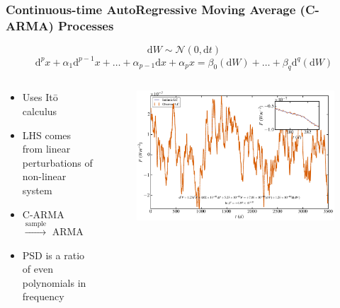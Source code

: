 \documentclass[hyperref={pdfpagelabels=false}]{beamer}
\begin{document}
\begin{frame}
\frametitle{Continuous-time AutoRegressive Moving Average (C-ARMA) Processes}
  \begin{equation*} \mathrm{d}W \sim \mathcal{N}(0,\mathrm{d}t) \end{equation*}
  \begin{equation*}\label{eq:CARMA} \mathrm{d}^{p}x + \alpha_{1} \mathrm{d}^{p-1}x + \ldots + \alpha_{p-1} \mathrm{d}x + \alpha_{p}x = \beta_{0} (\mathrm{d}W) + \ldots + \beta_{q} \mathrm{d}^{q}(\mathrm{d}W) \end{equation*}
  \begin{columns}
    \centering
    \begin{column}{0.5\textwidth}
      \begin{itemize}
        \item Uses It\={o} calculus {\tiny \citet{Davis,Brockwell14,Kelly14}}
        \item LHS comes from linear perturbations of non-linear system
        \item C-ARMA $\overset{\mathrm{sample}}\longrightarrow$ ARMA
        \item PSD is a ratio of even polynomials in frequency
      \end{itemize}
    \end{column}
    \begin{column}{0.5\textwidth}
      \begin{figure}
        \includegraphics[scale=0.0425]{images/CARMA(3,1)_LC.jpg}
      \end{figure}
    \end{column}
  \end{columns}
\end{frame}
\end{document}
